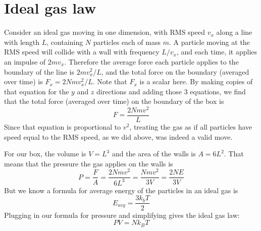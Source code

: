 \documentclass[12pt]{article}
\begin{document}
\section{Ideal gas law}
Consider an ideal gas moving in one dimension, with RMS speed $v_x$ along a line with length $L$, containing $N$ particles each of mass $m$. A particle moving at the RMS speed will collide with a wall with frequency $L / v_x$, and each time, it applies an impulse of $2 m v_x$. Therefore the average force each particle applies to the boundary of the line is $2 m v_x^2 / L$, and the total force on the boundary (averaged over time) is $F_x = 2 N m v_x^2 / L$. Note that $F_x$ is a scalar here. By making copies of that equation for the $y$ and $z$ directions and adding those 3 equations, we find that the total force (averaged over time) on the boundary of the box is
\[F= \frac{2Nmv^2}{L} \]
Since that equation is proportional to $v^2$, treating the gas as if all particles have speed equal to the RMS speed, as we did above, was indeed a valid move.

For our box, the volume is $V = L^3$ and the area of the walls is $A = 6L^2$. That means that the pressure the gas applies on the walls is
\[P = \frac{F}{A} = \frac{2Nmv^2}{6L^3} = \frac{Nmv^2}{3V} = \frac{2NE}{3V} \]
But we know a formula for average energy of the particles in an ideal gas is
\[E_{avg} = \frac{3 k_b T}{2}\]
Plugging in our formula for pressure and simplifying gives the ideal gas law:
\[P V = N k_B T\]
\end{document}
